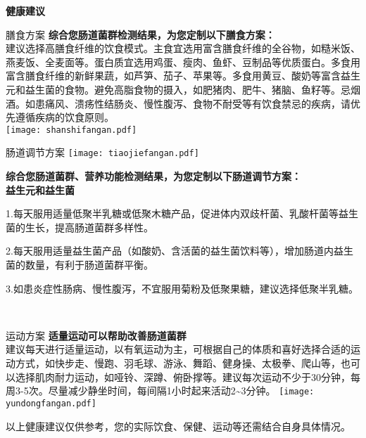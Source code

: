 

\usepackage{graphicx}
\graphicspath{{cores/}}



\vspace*{5mm}
\setlength{\arrayrulewidth}{1pt}
\fontsize{9.03pt}{11pt}\selectfont
\color{gray2}

\centerline{\bf\biaotia 健康建议}

\vspace*{2mm}

\begin{LRaside}[.20]{膳食方案}
{\bf *综合您肠道菌群检测结果，为您定制以下膳食方案：}\\
{\indent 建议选择高膳食纤维的饮食模式。主食宜选用富含膳食纤维的全谷物，如糙米饭、燕麦饭、全麦面等。蛋白质宜选用鸡蛋、瘦肉、鱼虾、豆制品等优质蛋白。多食用富含膳食纤维的新鲜果蔬，如芦笋、茄子、苹果等。多食用黄豆、酸奶等富含益生元和益生菌的食物。避免高脂食物的摄入，如肥猪肉、肥牛、猪脑、鱼籽等。忌烟酒。如患痛风、溃疡性结肠炎、慢性腹泻、食物不耐受等有饮食禁忌的疾病，请优先遵循疾病的饮食原则。}\\
\asidebreak %
\noindent
\texttt{[image: shanshifangan.pdf]}

\end{LRaside}


\begin{LRaside}[.70]{肠道调节方案}
\noindent
\texttt{[image: tiaojiefangan.pdf]}

\asidebreak %
{\bf *综合您肠道菌群、营养功能检测结果，为您定制以下肠道调节方案：}\\
{\bf 益生元和益生菌}\\{\indent 1.每天服用适量低聚半乳糖或低聚木糖产品，促进体内双歧杆菌、乳酸杆菌等益生菌的生长，提高肠道菌群多样性。

2.每天服用适量益生菌产品（如酸奶、含活菌的益生菌饮料等），增加肠道内益生菌的数量，有利于肠道菌群平衡。

3.如患炎症性肠病、慢性腹泻，不宜服用菊粉及低聚果糖，建议选择低聚半乳糖。}\\
\end{LRaside}

\begin{LRaside}[.20]{运动方案}
{\bf *适量运动可以帮助改善肠道菌群}\\
{\indent 建议每天进行适量运动，以有氧运动为主，可根据自己的体质和喜好选择合适的运动方式，如快步走、慢跑、羽毛球、游泳、舞蹈、健身操、太极拳、爬山等，也可以选择肌肉耐力运动，如哑铃、深蹲、俯卧撑等。建议每次运动不少于30分钟，每周3-5次。尽量减少静坐时间，每间隔1小时起来活动2\textasciitilde 3分钟。}
\asidebreak %
\noindent
\texttt{[image: yundongfangan.pdf]}

\end{LRaside}

{\noindent\qihao *以上健康建议仅供参考，您的实际饮食、保健、运动等还需结合自身具体情况。}



